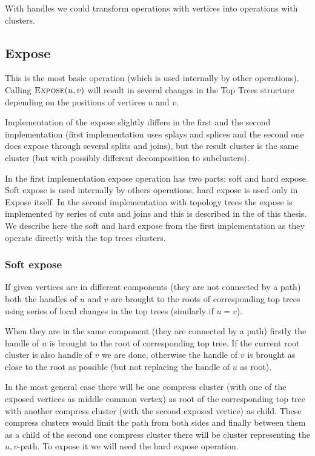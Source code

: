 With handles we could transform operations with vertices into operations with
clusters.

\subsection{Expose}

This is the most basic operation (which is used internally by other
operations). Calling $\hbox{\sc Expose}(u,v)$ will result in several changes in the Top
Trees structure depending on the positions of vertices $u$ and $v$.

Implementation of the expose slightly differs in the first and the second
implementation (first implementation uses splays and splices and the second one
does expose through several splits and joins), but the result cluster is the
same cluster (but with possibly different decomposition to subclusters).


In the first implementation expose operation has two parts: soft and hard
expose. Soft expose is used internally by others operations, hard expose is used
only in Expose itself.
In the second
implementation with topology trees the expose is implemented by series of cuts
and joins and this is described in the  of this thesis. We
describe here the soft and hard expose from the first implementation as they
operate directly with the top trees clusters.

\subsubsection{Soft expose}

If given vertices are in different components (they are not connected by a path)
both the handles of $u$ and $v$ are brought to the roots of corresponding top
trees using series of local changes in the top trees (similarly if $u=v$).

When they are in the same component (they are connected by a path) firstly the
handle of $u$ is brought to the root of corresponding top tree. If the current
root cluster is also handle of $v$ we are done, otherwise the handle of $v$ is
brought as close to the root as possible (but not replacing the handle of $u$ as
root).


In the most general case there will be one compress cluster (with one of the
exposed vertices as middle common vertex) as root of the corresponding top tree
with another compress cluster (with the second exposed vertice) as child. These
compress clusters would limit the path from both sides and finally between them
as a child of the second one compress cluster there will be cluster representing
the $u,v$-path. To expose it we will need the hard expose operation.

